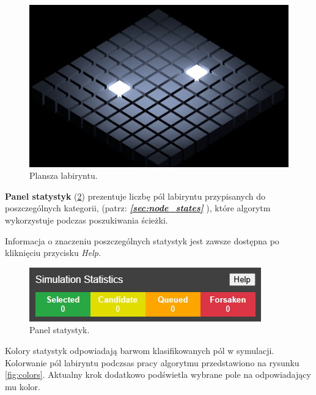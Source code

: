 \documentclass[../doc.tex]{subfiles}
\begin{document}
\begin{figure}[H]
  \centering
  \includegraphics[width=0.85\linewidth]{figures/field.png}
  \caption{Plansza labiryntu.}
  \label{fig:field}
\end{figure}

\textbf{Panel statystyk} (\cref{fig:stats})
prezentuje liczbę pól labiryntu przypisanych do poszczególnych kategorii, (patrz: \textit{\textbf{\ref{sec:node_states} }}), które algorytm wykorzystuje podczas poszukiwania ścieżki.



Informacja o znaczeniu poszczególnych statystyk jest zawsze dostępna po kliknięciu przycisku \textit{Help}.

\begin{figure}[H]
  \centering
  \includegraphics[width=0.6\linewidth]{figures/stats.png}
  \caption{Panel statystyk.}
  \label{fig:stats}
\end{figure}

Kolory statystyk odpowiadają barwom klasifikowanych pól w symulacji. Kolorwanie pól labiryntu podczsas pracy algorytmu przedstawiono na rysunku \ref{fig:colors}. Aktualny krok dodatkowo podświetla wybrane pole na odpowiadający mu kolor.
\end{document}
